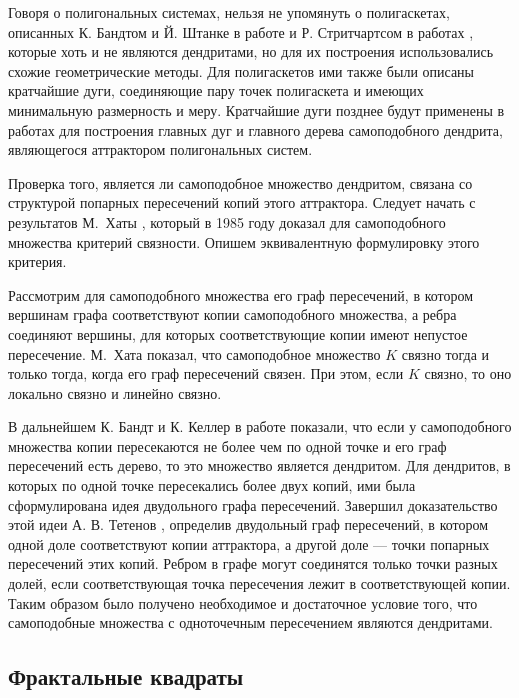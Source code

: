 Говоря о полигональных системах, нельзя не упомянуть о полигаскетах, описанных К. Бандтом и Й. Штанке в работе \cite{SSS6} и Р. Стритчартсом в работах \cite{strich1999, Strichartz1999}, которые хоть и не являются дендритами, но для их построения использовались схожие геометрические методы.
Для полигаскетов ими также были описаны кратчайшие дуги, соединяющие пару точек полигаскета и имеющих минимальную размерность и меру.
Кратчайшие дуги позднее будут применены в работах \cite{TSV2017, STV2017} для построения главных дуг и главного дерева самоподобного дендрита, являющегося аттрактором полигональных систем.

Проверка того, является ли самоподобное множество дендритом, связана со структурой попарных пересечений копий этого аттрактора.
Следует начать с результатов М.~Хаты \cite{Hata1985}, который в 1985 году доказал для самоподобного множества критерий связности.
Опишем эквивалентную формулировку этого критерия.

Рассмотрим для самоподобного множества его граф пересечений, в котором вершинам графа соответствуют копии самоподобного множества, а ребра соединяют вершины, для которых соответствующие копии имеют непустое пересечение.
М.~Хата показал, что самоподобное множество $K$ связно тогда и только тогда, когда его граф пересечений связен. 
При этом, если $K$ связно, то оно локально связно и линейно связно.

В дальнейшем К. Бандт и К. Келлер в работе \cite{SSS2} показали, что если у самоподобного множества копии пересекаются не более чем по одной точке и его граф пересечений есть дерево, то это множество является дендритом. Для дендритов, в которых по одной точке пересекались более двух копий, ими была сформулирована идея двудольного графа пересечений. 
Завершил доказательство этой идеи А. В. Тетенов \cite{FIP}, определив двудольный граф пересечений, в котором одной доле соответствуют копии аттрактора, а другой доле --- точки попарных пересечений этих копий. Ребром в графе могут соединятся только точки разных долей, если соответствующая точка пересечения лежит в соответствующей копии.
Таким образом было получено необходимое и достаточное условие того, что самоподобные множества с одноточечным пересечением являются дендритами.\\


\subsection{Фрактальные квадраты}
\label{ssec:HFS}

